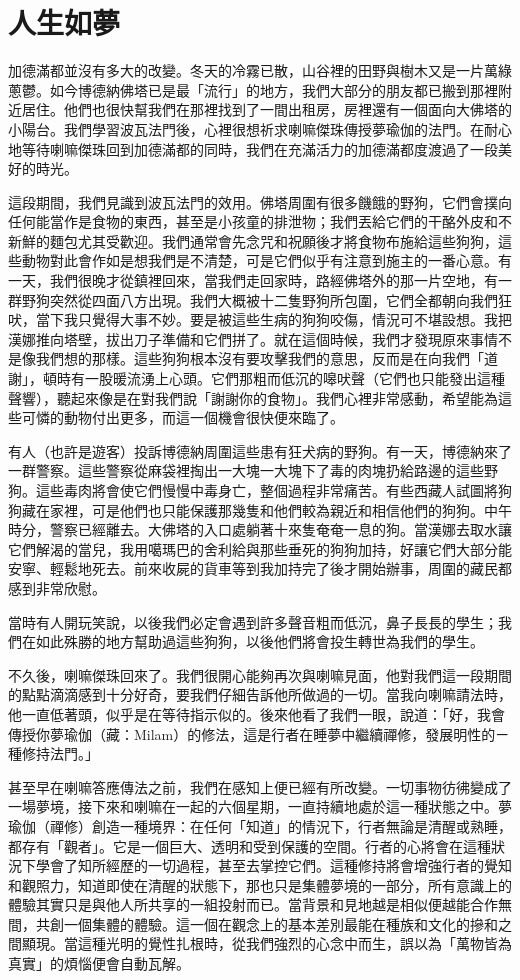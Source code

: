 \chapter{人生如夢}

加德滿都並沒有多大的改變。冬天的冷霧已散，山谷裡的田野與樹木又是一片萬綠蔥鬱。如今博德納佛塔已是最「流行」的地方，我們大部分的朋友都已搬到那裡附近居住。他們也很快幫我們在那裡找到了一間出租房，房裡還有一個面向大佛塔的小陽台。我們學習波瓦法門後，心裡很想祈求喇嘛傑珠傳授夢瑜伽的法門。在耐心地等待喇嘛傑珠回到加德滿都的同時，我們在充滿活力的加德滿都度渡過了一段美好的時光。

這段期間，我們見識到波瓦法門的效用。佛塔周圍有很多饑餓的野狗，它們會撲向任何能當作是食物的東西，甚至是小孩童的排泄物；我們丟給它們的干酪外皮和不新鮮的麵包尤其受歡迎。我們通常會先念咒和祝願後才將食物布施給這些狗狗，這些動物對此會作如是想我們是不清楚，可是它們似乎有注意到施主的一番心意。有一天，我們很晚才從鎮裡回來，當我們走回家時，路經佛塔外的那一片空地，有一群野狗突然從四面八方出現。我們大概被十二隻野狗所包圍，它們全都朝向我們狂吠，當下我只覺得大事不妙。要是被這些生病的狗狗咬傷，情況可不堪設想。我把漢娜推向塔壁，拔出刀子準備和它們拼了。就在這個時候，我們才發現原來事情不是像我們想的那樣。這些狗狗根本沒有要攻擊我們的意思，反而是在向我們「道謝」，頓時有一股暖流湧上心頭。它們那粗而低沉的嗥吠聲（它們也只能發出這種聲響），聽起來像是在對我們說「謝謝你的食物」。我們心裡非常感動，希望能為這些可憐的動物付出更多，而這一個機會很快便來臨了。

有人（也許是遊客）投訴博德納周圍這些患有狂犬病的野狗。有一天，博德納來了一群警察。這些警察從麻袋裡掏出一大塊一大塊下了毒的肉塊扔給路邊的這些野狗。這些毒肉將會使它們慢慢中毒身亡，整個過程非常痛苦。有些西藏人試圖將狗狗藏在家裡，可是他們也只能保護那幾隻和他們較為親近和相信他們的狗狗。中午時分，警察已經離去。大佛塔的入口處躺著十來隻奄奄一息的狗。當漢娜去取水讓它們解渴的當兒，我用噶瑪巴的舍利給與那些垂死的狗狗加持，好讓它們大部分能安寧、輕鬆地死去。前來收屍的貨車等到我加持完了後才開始辦事，周圍的藏民都感到非常欣慰。

當時有人開玩笑說，以後我們必定會遇到許多聲音粗而低沉，鼻子長長的學生；我們在如此殊勝的地方幫助過這些狗狗，以後他們將會投生轉世為我們的學生。

不久後，喇嘛傑珠回來了。我們很開心能夠再次與喇嘛見面，他對我們這一段期間的點點滴滴感到十分好奇，要我們仔細告訴他所做過的一切。當我向喇嘛請法時，他一直低著頭，似乎是在等待指示似的。後來他看了我們一眼，說道：「好，我會傳授你夢瑜伽（藏：Milam）的修法，這是行者在睡夢中繼續禪修，發展明性的ㄧ種修持法門。」

甚至早在喇嘛答應傳法之前，我們在感知上便已經有所改變。一切事物彷彿變成了一場夢境，接下來和喇嘛在一起的六個星期，一直持續地處於這一種狀態之中。夢瑜伽（禪修）創造一種境界：在任何「知道」的情況下，行者無論是清醒或熟睡，都存有「觀者」。它是一個巨大、透明和受到保護的空間。行者的心將會在這種狀況下學會了知所經歷的一切過程，甚至去掌控它們。這種修持將會增強行者的覺知和觀照力，知道即使在清醒的狀態下，那也只是集體夢境的一部分，所有意識上的體驗其實只是與他人所共享的一組投射而已。當背景和見地越是相似便越能合作無間，共創一個集體的體驗。這一個在觀念上的基本差別最能在種族和文化的摻和之間顯現。當這種光明的覺性扎根時，從我們強烈的心念中而生，誤以為「萬物皆為真實」的煩惱便會自動瓦解。

